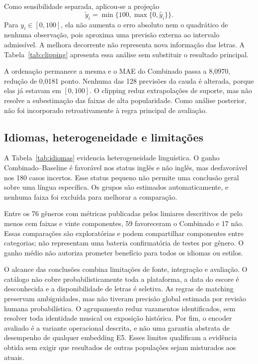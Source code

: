 Como sensibilidade separada, aplicou-se a projeção
\begin{equation}\label{eq:clipping}
 \widetilde y_i=\min\{100,\max\{0,\widehat y_i\}\}.
\end{equation}
Para $y_i\in[0,100]$, ela não aumenta o erro absoluto nem o quadrático de nenhuma observação, pois aproxima uma previsão externa ao intervalo admissível. A melhora decorrente não representa nova informação das letras. A Tabela~\ref{tab:clipping} apresenta essa análise sem substituir o resultado principal.



A ordenação permanece a mesma e o MAE do Combinado passa a 8,0970, redução de 0,0181 ponto. Nenhuma das 128 previsões da cauda é alterada, porque elas já estavam em $[0,100]$. O clipping reduz extrapolações de suporte, mas não resolve a subestimação das faixas de alta popularidade. Como análise posterior, não foi incorporado retroativamente à regra principal de avaliação.

\subsection{Idiomas, heterogeneidade e limitações}
A Tabela~\ref{tab:idiomas} evidencia heterogeneidade linguística. O ganho Combinado--Baseline é favorável nos status inglês e não inglês, mas desfavorável nos 180 casos incertos. Esse status pequeno não permite uma conclusão geral sobre uma língua específica. Os grupos são estimados automaticamente, e nenhuma faixa foi excluída para melhorar a comparação.



Entre os 76 gêneros com métricas publicadas pelos limiares descritivos de pelo menos cem faixas e vinte componentes, 59 favoreceram o Combinado e 17 não. Essas comparações são exploratórias e podem compartilhar componentes entre categorias; não representam uma bateria confirmatória de testes por gênero. O ganho médio não autoriza prometer benefício para todos os idiomas ou estilos.

O alcance das conclusões combina limitações de fonte, integração e avaliação. O catálogo não cobre probabilisticamente toda a plataforma, a data do escore é desconhecida e a disponibilidade de letras é seletiva. As regras de matching preservam ambiguidades, mas não tiveram precisão global estimada por revisão humana probabilística. O agrupamento reduz vazamentos identificados, sem resolver toda identidade musical ou exposição histórica. Por fim, o encoder avaliado é a variante operacional descrita, e não uma garantia abstrata de desempenho de qualquer embedding E5. Esses limites qualificam a evidência obtida sem exigir que resultados de outras populações sejam misturados aos atuais.
